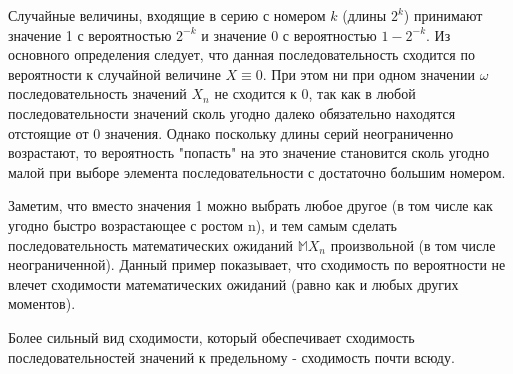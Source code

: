 \documentclass[12pt, twoside]{article}
\theoremstyle{definition}
\begin{document}
Случайные величины, входящие в серию с номером $k$ (длины $2^k$) принимают значение 1 с вероятностью $2^{-k}$ и значение 0 с вероятностью $1-2^{-k}$. Из основного определения следует, что данная последовательность сходится по вероятности к случайной величине $X\equiv 0$. При этом ни при одном значении $\omega$ последовательность значений $X_n$ не сходится к 0, так как в любой последовательности значений сколь угодно далеко обязательно находятся отстоящие от 0 значения. Однако поскольку длины серий неограниченно возрастают, то вероятность "попасть" на это значение становится сколь угодно малой при выборе элемента последовательности с достаточно большим номером.

Заметим, что вместо значения 1 можно выбрать любое другое (в том числе как угодно быстро возрастающее с ростом n), и тем самым сделать последовательность математических ожиданий $\mathbb{M}X_n$ произвольной (в том числе неограниченной). Данный пример показывает, что сходимость по вероятности не влечет сходимости математических ожиданий (равно как и любых других моментов).

Более сильный вид сходимости, который обеспечивает сходимость последовательностей значений к предельному - сходимость почти всюду.

\begin{comment}
\section{Выбор моделей}

Задача выбора модели является одной из самых актуальных в регрессионном анализе. 
В современной зарубежной литературе для ее решения используется принцип минимальной длины описания. Он предлагает использовать для описания данных наиболее простую
и одновременно наиболее точную модель ь [115, 120, 116, 117, 165].

Как альтернатива
информационным критериям [56, 57, 14, 15, 84, 274] был предложен метод двухуровневого
байесовского вывода. На первом уровне вывода настраиваются параметры моделей. На втором уровне настраиваются их гиперпараметры. Согласно этому методу, вероятность выбора
более сложной модели ниже вероятности выбора простой модели при сравнимом значении
функции ошибки на регрессионных остатках. Принципы байесовского подхода для выбора
линейных моделей регрессии и классификации предложены авторами [62, 26, 30, 31].

Одновременно с оценкой параметров вычисляются и гиперпараметры (параметры распределения параметров) модели. 
\end{comment}
\end{document}
